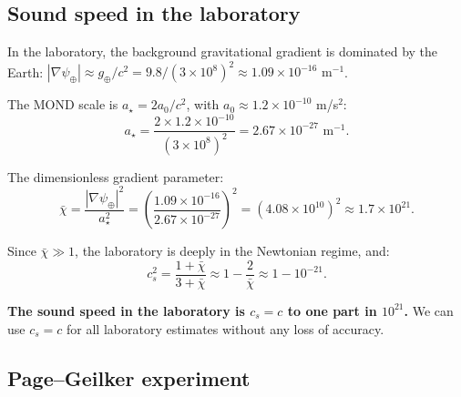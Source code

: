 \documentclass[12pt,a4paper]{article}
\begin{document}
\subsection{Sound speed in the laboratory}

In the laboratory, the background gravitational gradient is dominated by
the Earth: $|\nabla\psi_\oplus| \approx g_\oplus/c^2 = 9.8/(3 \times 10^8)^2
\approx 1.09 \times 10^{-16}\text{ m}^{-1}$.

The MOND scale is $a_\star = 2a_0/c^2$, with $a_0 \approx 1.2 \times 10^{-10}$
m/s$^2$:
\begin{equation}
a_\star = \frac{2 \times 1.2 \times 10^{-10}}{(3 \times 10^8)^2}
= 2.67 \times 10^{-27}\text{ m}^{-1}.
\end{equation}

The dimensionless gradient parameter:
\begin{equation}
\bar\chi = \frac{|\nabla\psi_\oplus|^2}{a_\star^2}
= \left(\frac{1.09 \times 10^{-16}}{2.67 \times 10^{-27}}\right)^2
= (4.08 \times 10^{10})^2 \approx 1.7 \times 10^{21}.
\end{equation}

Since $\bar\chi \gg 1$, the laboratory is deeply in the Newtonian
regime, and:
\begin{equation}
c_s^2 = \frac{1 + \bar\chi}{3 + \bar\chi} \approx 1 - \frac{2}{\bar\chi}
\approx 1 - 10^{-21}.
\end{equation}

\textbf{The sound speed in the laboratory is $c_s = c$ to one part in
$10^{21}$.} We can use $c_s = c$ for all laboratory estimates without
any loss of accuracy.

\subsection{Page--Geilker experiment}
\end{document}
